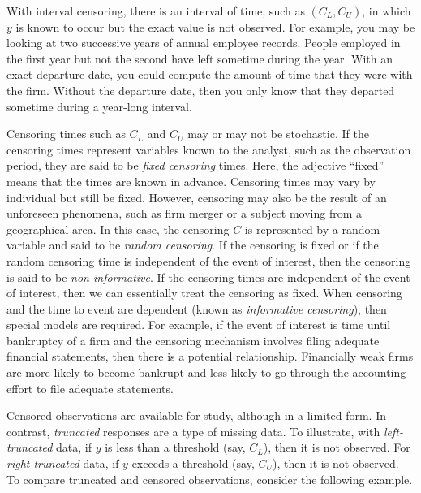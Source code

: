 
With interval censoring, there is an interval of time, such as
$(C_L, C_U)$, in which $y$ is known to occur but the exact value is
not observed. For example, you may be looking at two successive
years of annual employee records. People employed in the first year
but not the second have left sometime during the year. With an exact
departure date, you could compute the amount of time that they were
with the firm. Without the departure date, then you only know that
they departed sometime during a year-long interval.



Censoring times such as $C_L$ and $C_U$ may or may not be
stochastic. If the censoring times represent variables known to the
analyst, such as the observation period, they are said to be
\emph{fixed censoring} times. Here, the adjective ``fixed'' means
that the times are known in advance. Censoring times may vary by
individual but still be fixed. However, censoring may also be the
result of an unforeseen phenomena, such as firm merger or a subject
moving from a geographical area. In this case, the censoring $C$ is
represented by a random variable and said to be \emph{random
censoring}. If the censoring is fixed or if the random censoring
time is independent of the event of interest, then the censoring is
said to be \emph{non-informative}. If the censoring times are
independent of the event of interest, then we can essentially treat
the censoring as fixed. When censoring and the time to event are
dependent (known as \emph{informative censoring}), then special
models are required. For example, if the event of interest is time
until bankruptcy of a firm and the censoring mechanism involves
filing adequate financial statements, then there is a potential
relationship. Financially weak firms are more likely to become
bankrupt and less likely to go through the accounting effort to file
adequate statements.

Censored observations are available for study, although in a limited
form. In contrast, \emph{truncated} responses are a type of missing
data. To illustrate, with \emph{left-truncated }data, if $y$ is less
than a threshold (say, $C_L$), then it is not observed. For
\emph{right-truncated} data, if $y$ exceeds a threshold (say,
$C_U$), then it is not observed. To compare truncated and censored
observations, consider the following
example.

